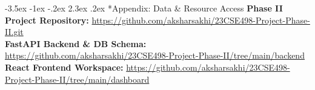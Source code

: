 \documentclass[11pt, a4paper]{article}
\makeatletter
\renewcommand\section{\@startsection {section}{1}{\z@}%
                                   {-3.5ex \@plus -1ex \@minus -.2ex}%
                                   {2.3ex \@plus.2ex}%
                                   {\normalfont\large\bfseries\color{amritaMaroon}}}
\makeatother
\begin{document}
\vspace{0.2cm}
\section*{Appendix: Data \& Resource Access}
\scriptsize
\textbf{Phase II Project Repository:} \url{https://github.com/aksharsakhi/23CSE498-Project-Phase-II.git} \\
\textbf{FastAPI Backend \& DB Schema:} \url{https://github.com/aksharsakhi/23CSE498-Project-Phase-II/tree/main/backend} \\
\textbf{React Frontend Workspace:} \url{https://github.com/aksharsakhi/23CSE498-Project-Phase-II/tree/main/dashboard} \\
\normalsize

\nocite{churaev2023,jothimurugesan2022,arivazhagan2020,mcmahan2017,liu2022}
\nocite{yang2025mvfl,kalakoti2025fedxai,noseda2025financial,karamanlioglu2025clinical,wang2025personalized}
\nocite{abdelsater2024llama,maher2025automl,gupta2025privacy,yuan2024trend,tang2025horizon}
\nocite{zhang2022multitask,larocca2021attention,amato2023clustering,larocca2022shap,bernardi2023adaptive}
\nocite{dusing2025sepsis,qayyum2023fedsepsis,lei2025supervised,pan2025multiprog,maurya2025secure}



\end{document}
